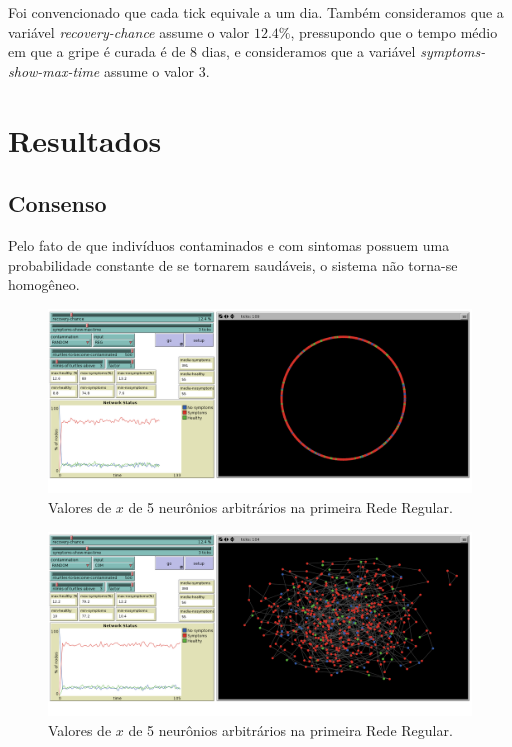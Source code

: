\documentclass{article}
\begin{document}
Foi convencionado que cada tick equivale a um dia. Também consideramos que a variável \textit{recovery-chance} assume o valor $12.4 \%$, pressupondo que o tempo médio em que a gripe é curada é de 8 dias, e consideramos que a variável \textit{symptoms-show-max-time} assume o valor 3.


\section{Resultados}
\subsection{Consenso}
Pelo fato de que indivíduos contaminados e com sintomas possuem uma probabilidade constante de se tornarem saudáveis, o sistema não torna-se homogêneo.

\begin{figure}[H]
  \centerline{\includegraphics[width=\linewidth]{REG_consenso.png}}
  \caption{Valores de $x$ de 5 neurônios arbitrários na primeira Rede Regular.}
  \label{fig:boat1}
\end{figure}

\begin{figure}[H]
  \centerline{\includegraphics[width=\linewidth]{COM_consenso.png}}
  \caption{Valores de $x$ de 5 neurônios arbitrários na primeira Rede Regular.}
  \label{fig:boat1}
\end{figure}
\end{document}
